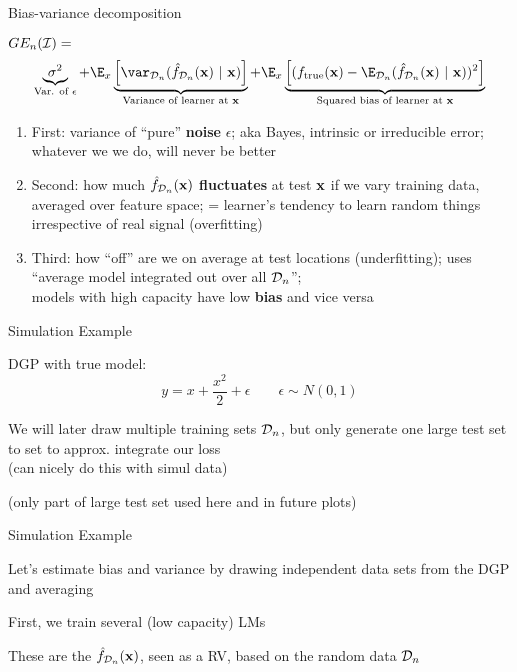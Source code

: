 \documentclass[11pt,compress,t,notes=noshow, xcolor=table]{beamer}
\begin{document}
\begin{frame}{Bias-variance decomposition}


$GE_n(\mathcal{I}) =$  
$$
\underbrace{\sigma^2}_{\text{Var. of $\epsilon$}} + \E_{x}\underbrace{\left[\var_{\D_n}(\fh_{\D_n}(\xv) ~|~\xv)\right]}_{\text{Variance of learner at } \xv} + \E_{x}\underbrace{\left[(\ftrue(\xv)-\E_{\D_n}(\fh_{\D_n}(\xv)~|~\xv))^2\right]}_{\text{Squared bias of learner at } \xv}  
$$

\begin{enumerate}
\item First: variance of ``pure''
\textbf{noise} $\epsilon$; aka Bayes, intrinsic or irreducible error; 
whatever we we do, will never be better
\item Second: how much \textbf{$\hat{f}_{\mathcal{D}_n}(\mathbf{x})$ fluctuates} at test $\mathbf{x}$ if we vary training data, averaged over feature space; = learner's tendency to learn random things irrespective of real signal (overfitting)

\item Third: how ``off'' are we on average at test locations (underfitting); uses ``average model integrated out over all $\mathcal{D}_n$''; \\
models with high capacity have low \textbf{bias} and vice versa
\end{enumerate}


\end{frame} 

\begin{framei}[sep=L]{Simulation Example}

\item DGP with true model:
$$y = x + \frac{x^2}{2} + \epsilon  \qquad \epsilon \sim 
N (0, 1)$$
\item We will later draw multiple training sets $\mathcal{D}_n$, but only generate one
large test set to set to approx. integrate our loss\\
(can nicely do this with simul data)


(only part of large test set used here and in future plots)
\end{framei} 


\begin{framei}[sep=M]{Simulation Example}

\item Let's estimate bias and variance by drawing independent data sets from the DGP and averaging


\item First, we train several (low capacity) LMs
\item These are the $\hat{f}_{\mathcal{D}_n}(\mathbf{x})$, seen as a RV, based on the random
data $\mathcal{D}_n$

\hfill

\splitVCC
{}
{}

\end{framei} 
\end{document}
